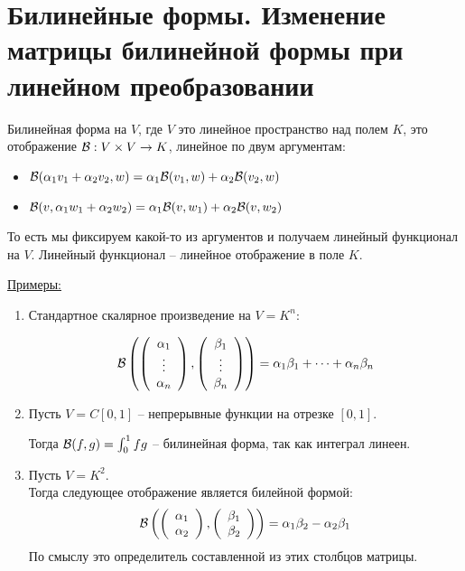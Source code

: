 \section{Билинейные формы. Изменение матрицы билинейной формы при линейном преобразовании}
\begin{conj}
    Билинейная форма на $V$, где $V$ это линейное пространство над полем $K$, это отображение $\mathcal{B}: V \times V \to K$, линейное по двум аргументам:
    \begin{itemize}
        \item $\mathcal{B}(\alpha_1 v_1 + \alpha_2 v_2, w) = \alpha_1 \mathcal{B}(v_1, w) + \alpha_2\mathcal{B}(v_2, w)$
        \item $\mathcal{B}(v, \alpha_1 w_1 + \alpha_2 w_2) = \alpha_1 \mathcal{B}(v, w_1) + \alpha_2\mathcal{B}(v, w_2)$
    \end{itemize}
    \end{conj}
    
    \vspace*{5mm}
    То есть мы фиксируем какой-то из аргументов и получаем линейный функционал на $V$.
    Линейный функционал -- линейное отображение в поле $K$.
    
    \underline{Примеры:}
    \begin{enumerate}
        \item Стандартное скалярное произведение на $V = K^n$:
    
        \[ \mathcal{B} \left(
           \left(\begin{array}{c}
           \alpha_1 \\ 
           \vdots \\ 
           \alpha_n
           \end{array}\right),
           \left(\begin{array}{c}
           \beta_1 \\ 
           \vdots \\
           \beta_n
           \end{array}\right) 
        \right) = \alpha_1 \beta_1 + \dots + \alpha_n \beta_n \]
    
        \item Пусть $V = C[0, 1]$ -- непрерывные функции на отрезке $[0, 1]$. 
        
        Тогда $\mathcal{B}(f, g) = \int_{0}^{1} fg$ -- билинейная форма, так как интеграл линеен.
    
        \item Пусть $V = K^2$. \\
        Тогда следующее отображение является билейной формой: \[ \mathcal{B} \left(
            \left(\begin{array}{c}
            \alpha_1 \\ 
            \alpha_2
            \end{array}\right),
            \left(\begin{array}{c}
            \beta_1 \\ 
            \beta_2
            \end{array}\right)
        \right) = \alpha_1 \beta_2 - \alpha_2 \beta_1 \]
        По смыслу это определитель составленной из этих столбцов матрицы.
    \end{enumerate}
    
